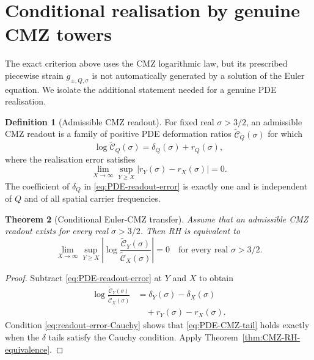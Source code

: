 \documentclass[11pt]{amsart}
\numberwithin{equation}{section}
\theoremstyle{plain}
\newtheorem{theorem}{Theorem}[section]
\theoremstyle{definition}
\newtheorem{definition}[theorem]{Definition}
\theoremstyle{remark}
\begin{document}
\section{Conditional realisation by genuine CMZ towers}
\label{sec:PDE-realisation}

The exact criterion above uses the CMZ logarithmic law, but its prescribed
piecewise strain $g_{\pm,Q,\sigma}$ is not automatically generated by a
solution of the Euler equation.  We isolate the additional statement needed
for a genuine PDE realisation.

\begin{definition}[Admissible CMZ readout]
\label{def:admissible-readout}
For fixed real $\sigma>3/2$, an admissible CMZ readout is a family of positive
PDE deformation ratios $\widetilde{\mathscr C}_Q(\sigma)$ for which
\begin{equation}
\log\widetilde{\mathscr C}_Q(\sigma)
=\delta_Q(\sigma)+r_Q(\sigma),
\label{eq:PDE-readout-error}
\end{equation}
where the realisation error satisfies
\begin{equation}
\lim_{X\to\infty}\sup_{Y\ge X}
|r_Y(\sigma)-r_X(\sigma)|=0.
\label{eq:readout-error-Cauchy}
\end{equation}
The coefficient of $\delta_Q$ in \eqref{eq:PDE-readout-error} is exactly one
and is independent of $Q$ and of all spatial carrier frequencies.
\end{definition}

\begin{theorem}[Conditional Euler-CMZ transfer]
\label{thm:conditional-PDE-transfer}
Assume that an admissible CMZ readout exists for every real
$\sigma>3/2$.  Then RH is equivalent to
\begin{equation}
\lim_{X\to\infty}\sup_{Y\ge X}
\left|
\log\frac{\widetilde{\mathscr C}_Y(\sigma)}
{\widetilde{\mathscr C}_X(\sigma)}
\right|=0
\quad\text{for every real }\sigma>3/2.
\label{eq:PDE-CMZ-tail}
\end{equation}
\end{theorem}

\begin{proof}
Subtract \eqref{eq:PDE-readout-error} at $Y$ and $X$ to obtain
\begin{align}
\log\frac{\widetilde{\mathscr C}_Y(\sigma)}
{\widetilde{\mathscr C}_X(\sigma)}
&=\delta_Y(\sigma)-\delta_X(\sigma)
\label{eq:PDE-tail-decomposition-one}\\
&\quad+r_Y(\sigma)-r_X(\sigma).
\label{eq:PDE-tail-decomposition-two}
\end{align}
Condition \eqref{eq:readout-error-Cauchy} shows that
\eqref{eq:PDE-CMZ-tail} holds exactly when the $\delta$ tails satisfy the
Cauchy condition.  Apply Theorem~\ref{thm:CMZ-RH-equivalence}.
\end{proof}
\end{document}
